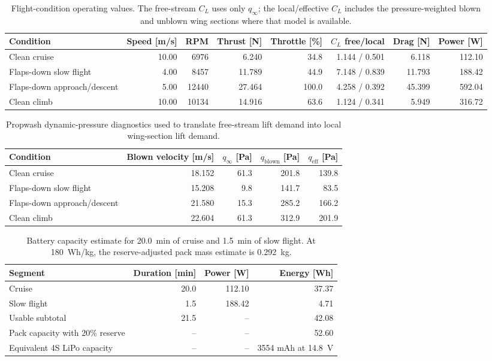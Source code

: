 \documentclass[11pt]{article}
\begin{document}
\begin{table}[H]
\centering
\small
\begin{tabular}{lrrrrrrr}
\toprule
Condition & Speed [m/s] & RPM & Thrust [N] & Throttle [\%] & \(C_L\) free/local & Drag [N] & Power [W] \\
\midrule
Clean cruise & 10.00 & \num{6976} & 6.240 & 34.8 & 1.144 / 0.501 & 6.118 & 112.10 \\
Flaps-down slow flight & 4.00 & \num{8457} & 11.789 & 44.9 & 7.148 / 0.839 & 11.793 & 188.42 \\
Flaps-down approach/descent & 5.00 & \num{12440} & 27.464 & 100.0 & 4.258 / 0.392 & 45.399 & 592.04 \\
Clean climb & 10.00 & \num{10134} & 14.916 & 63.6 & 1.124 / 0.341 & 5.949 & 316.72 \\
\bottomrule
\end{tabular}
\caption{Flight-condition operating values. The free-stream \(C_L\) uses only \(q_\infty\); the local/effective \(C_L\) includes the pressure-weighted blown and unblown wing sections where that model is available.}
\label{tab:stage3-cl-rpm}
\end{table}

\begin{table}[H]
\centering
\begin{tabular}{lrrrr}
\toprule
Condition & Blown velocity [m/s] & \(q_\infty\) [Pa] & \(q_\mathrm{blown}\) [Pa] & \(q_\mathrm{eff}\) [Pa] \\
\midrule
Clean cruise & 18.152 & 61.3 & 201.8 & 139.8 \\
Flaps-down slow flight & 15.208 & 9.8 & 141.7 & 83.5 \\
Flaps-down approach/descent & 21.580 & 15.3 & 285.2 & 166.2 \\
Clean climb & 22.604 & 61.3 & 312.9 & 201.9 \\
\bottomrule
\end{tabular}
\caption{Propwash dynamic-pressure diagnostics used to translate free-stream lift demand into local wing-section lift demand.}
\label{tab:stage3-propwash-q}
\end{table}

\begin{table}[H]
\centering
\begin{tabular}{lrrr}
\toprule
Segment & Duration [min] & Power [W] & Energy [Wh] \\
\midrule
Cruise & 20.0 & 112.10 & 37.37 \\
Slow flight & 1.5 & 188.42 & 4.71 \\
Usable subtotal & 21.5 & -- & 42.08 \\
Pack capacity with 20\% reserve & -- & -- & 52.60 \\
Equivalent 4S LiPo capacity & -- & -- & 3554 mAh at \SI{14.8}{V} \\
\bottomrule
\end{tabular}
\caption{Battery capacity estimate for \SI{20.0}{min} of cruise and \SI{1.5}{min} of slow flight. At \SI{180}{Wh/kg}, the reserve-adjusted pack mass estimate is \SI{0.292}{kg}.}
\label{tab:stage3-battery-capacity}
\end{table}
\end{document}
